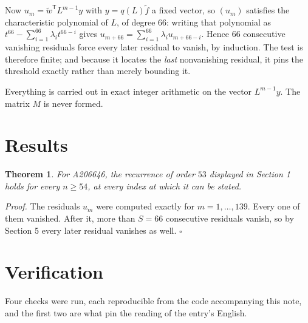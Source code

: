 \documentclass[11pt]{article}
\newtheorem{theorem}{Theorem}
\theoremstyle{definition}
\begin{document}
Now $u_m = \tilde w^{\mathsf T} L^{m-1} y$ with $y = q(L)\tilde f$ a fixed vector, so $(u_m)$ satisfies the characteristic polynomial of $L$, of degree $66$: writing that polynomial as $t^{66} - \sum_{i=1}^{66} \lambda_i t^{66-i}$ gives $u_{m+66} = \sum_{i=1}^{66} \lambda_i u_{m+66-i}$. Hence $66$ consecutive vanishing residuals force every later residual to vanish, by induction. The test is therefore finite; and because it locates the {\itshape last} nonvanishing residual, it pins the threshold exactly rather than merely bounding it.

Everything is carried out in exact integer arithmetic on the vector $L^{m-1}y$. The matrix $M$ is never formed.

\section{Results}

\begin{theorem} For A206646, the recurrence of order $53$ displayed in Section 1 holds for every $n \ge 54$, at every index at which it can be stated.\end{theorem}

{\itshape Proof.} The residuals $u_m$ were computed exactly for $m = 1,\dots,139$. Every one of them vanished. After it, more than $S = 66$ consecutive residuals vanish, so by Section 5 every later residual vanishes as well. $\square$

\section{Verification}

Four checks were run, each reproducible from the code accompanying this note, and the first two are what pin the reading of the entry's English.
\end{document}

